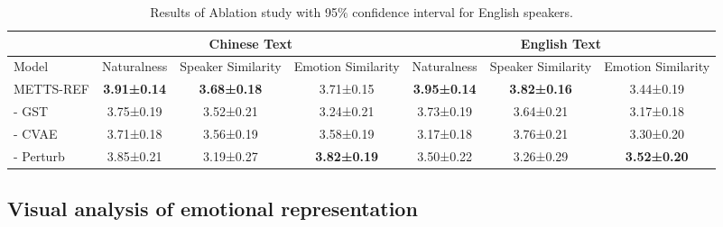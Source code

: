 \documentclass[journal,comsoc]{IEEEtran}
\begin{document}
\begin{table}[htb]
\centering
\caption{Results of Ablation study with 95$\%$ confidence interval for English speakers.}
\label{tab_10}
\begin{tabular}{@{}l|ccc|ccc@{}}
\toprule
                             & \multicolumn{3}{c|}{Chinese Text}                            & \multicolumn{3}{c}{English Text}                      \\ \midrule
Model                        & Naturalness & Speaker Similarity & Emotion Similarity & Naturalness & Speaker Similarity & Emotion Similarity \\ \midrule
METTS-REF     & \textbf{3.91±0.14} & \textbf{3.68±0.18} & 3.71±0.15 & \textbf{3.95±0.14}  & \textbf{3.82±0.16}  & 3.44±0.19 \\
\: - GST                & 3.75±0.19          & 3.52±0.21          & 3.24±0.21          & 3.73±0.19          & 3.64±0.21          & 3.17±0.18          \\
\: - CVAE             & 3.71±0.18          & 3.56±0.19          & 3.58±0.19          & 3.17±0.18          & 3.76±0.21          & 3.30±0.20          \\
\: - Perturb   & 3.85±0.21 & 3.19±0.27          & \textbf{3.82±0.19} & 3.50±0.22 & 3.26±0.29                  & \textbf{3.52±0.20} \\ \bottomrule
\end{tabular}
\end{table}

\subsection{Visual analysis of emotional representation}
\end{document}
